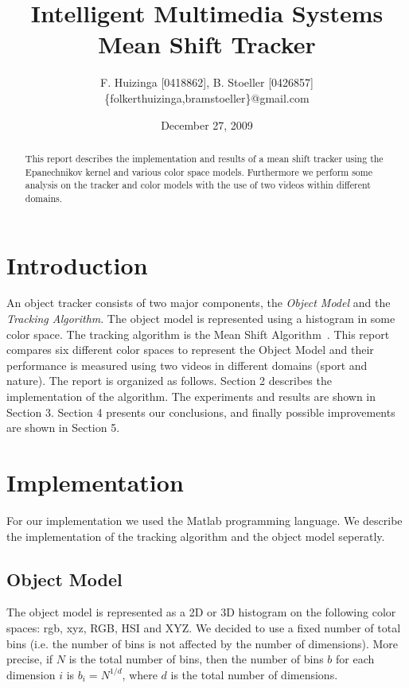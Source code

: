 \documentclass[11pt]{article}
\title{Intelligent Multimedia Systems \\ Mean Shift Tracker}
\author{F. Huizinga [0418862], B. Stoeller [0426857] \\
      \{folkerthuizinga,bramstoeller\}@gmail.com}
\date{December 27, 2009}
\begin{document}
\maketitle

\begin{abstract}
This report describes the implementation and results of a mean shift tracker
using the Epanechnikov kernel and various color space models. Furthermore we
perform some analysis on the tracker and color models with the use of two
videos within different domains.
\end{abstract}


\section{Introduction}
An object tracker consists of two major components, the \emph{Object Model} and
the \emph{Tracking Algorithm}. The object model is represented using a
histogram in some color space. The tracking algorithm is the Mean Shift
Algorithm~\cite{kernel-basedobject, real-timetracking}. This report compares
six different color spaces to represent the Object Model and their performance
is measured using two videos in different domains (sport and nature). The
report is organized as follows.  Section 2 describes the implementation of the
algorithm. The experiments and results are shown in Section 3. Section 4
presents our conclusions, and finally possible improvements are shown in
Section 5. \newpage


\section{Implementation}
For our implementation we used the Matlab programming language. We describe the
implementation of the tracking algorithm and the object model seperatly.

\subsection{Object Model}
The object model is represented as a 2D or 3D histogram on the following color
spaces: rgb, xyz, RGB, HSI and XYZ. We decided to use a fixed number of total
bins (i.e. the number of bins is not affected by the number of dimensions).
More precise, if $N$ is the total number of bins, then the number of bins $b$
for each dimension $i$ is $b_i = N^{1/d}$, where $d$ is the total number of
dimensions. 
\end{document}
